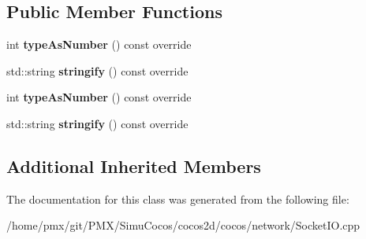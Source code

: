 \subsection*{Public Member Functions}
\begin{DoxyCompactItemize}
\item 
\mbox{\label{classnetwork_1_1SocketIOPacketV10x_a24b59c54adf1e213346bf4e4c4e9a56a}} 
int {\bfseries type\+As\+Number} () const override
\item 
\mbox{\label{classnetwork_1_1SocketIOPacketV10x_ab038ed5d76877bff6023f5d0c97e5f91}} 
std\+::string {\bfseries stringify} () const override
\item 
\mbox{\label{classnetwork_1_1SocketIOPacketV10x_a24b59c54adf1e213346bf4e4c4e9a56a}} 
int {\bfseries type\+As\+Number} () const override
\item 
\mbox{\label{classnetwork_1_1SocketIOPacketV10x_ab038ed5d76877bff6023f5d0c97e5f91}} 
std\+::string {\bfseries stringify} () const override
\end{DoxyCompactItemize}
\subsection*{Additional Inherited Members}


The documentation for this class was generated from the following file\+:\begin{DoxyCompactItemize}
\item 
/home/pmx/git/\+P\+M\+X/\+Simu\+Cocos/cocos2d/cocos/network/Socket\+I\+O.\+cpp\end{DoxyCompactItemize}
